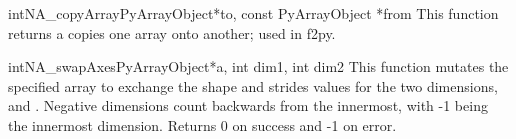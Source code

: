 \begin{cfuncdesc}{int}{NA_copyArray}{PyArrayObject*to, const PyArrayObject *from}
This function returns a copies one array onto another;  used in f2py.
\end{cfuncdesc}

\begin{cfuncdesc}{int}{NA_swapAxes}{PyArrayObject*a, int dim1, int dim2}
This function mutates the specified array  to exchange the shape and
strides values for the two dimensions,  and .  Negative
dimensions count backwards from the innermost, with -1 being the innermost
dimension.  Returns 0 on success and -1 on error.
\end{cfuncdesc}

